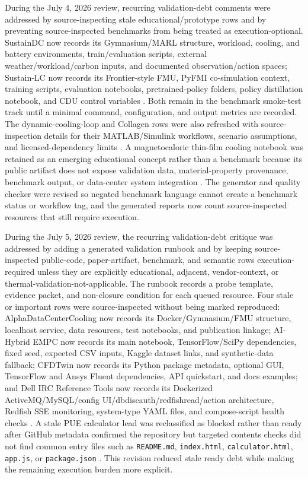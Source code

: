 \documentclass[11pt]{article}
\begin{document}
During the July 4, 2026 review, recurring validation-debt comments were addressed by source-inspecting stale educational/prototype rows and by preventing source-inspected benchmarks from being treated as execution-optional. SustainDC now records its Gymnasium/MARL structure, workload, cooling, and battery environments, train/evaluation scripts, external weather/workload/carbon inputs, and documented observation/action spaces; Sustain-LC now records its Frontier-style FMU, PyFMI co-simulation context, training scripts, evaluation notebooks, pretrained-policy folders, policy distillation notebook, and CDU control variables \cite{HPEDCRL2026,HPESustainLC2026}. Both remain in the benchmark smoke-test track until a minimal command, configuration, and output metrics are recorded. The dynamic-cooling-loop and Collagen rows were also refreshed with source-inspection details for their MATLAB/Simulink workflows, scenario assumptions, and licensed-dependency limits \cite{SamruditionDynamicCoolingLoop2026,CollagenCooling2026}. A magnetocaloric thin-film cooling notebook was retained as an emerging educational concept rather than a benchmark because its public artifact does not expose validation data, material-property provenance, benchmark output, or data-center system integration \cite{XenabMagnetocaloricCooling2026}. The generator and quality checker were revised so negated benchmark language cannot create a benchmark status or workflow tag, and the generated reports now count source-inspected resources that still require execution.

During the July 5, 2026 review, the recurring validation-debt critique was addressed by adding a generated validation runbook and by keeping source-inspected public-code, paper-artifact, benchmark, and semantic rows execution-required unless they are explicitly educational, adjacent, vendor-context, or thermal-validation-not-applicable. The runbook records a probe template, evidence packet, and non-closure condition for each queued resource. Four stale or important rows were source-inspected without being marked reproduced: AlphaDataCenterCooling now records its Docker/Gymnasium/FMU structure, localhost service, data resources, test notebooks, and publication linkage; AI-Hybrid EMPC now records its main notebook, TensorFlow/SciPy dependencies, fixed seed, expected CSV inputs, Kaggle dataset links, and synthetic-data fallback; CFDTwin now records its Python package metadata, optional GUI, TensorFlow and Ansys Fluent dependencies, API quickstart, and docs examples; and Dell IRC Reference Tools now records its Dockerized ActiveMQ/MySQL/config UI/dbdiscauth/redfishread/action architecture, Redfish SSE monitoring, system-type YAML files, and compose-script health checks \cite{AlphaDataCenterCooling2026,AIHybridEMPC2026,CFDTwin2026,DellIRC2026}. A stale PUE calculator lead was reclassified as blocked rather than ready after GitHub metadata confirmed the repository but targeted contents checks did not find common entry files such as \texttt{README.md}, \texttt{index.html}, \texttt{calculator.html}, \texttt{app.js}, or \texttt{package.json} \cite{EfficiencyCalculatorWeb2026}. This revision reduced stale ready debt while making the remaining execution burden more explicit.
\end{document}
